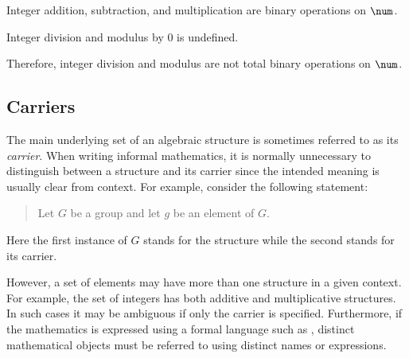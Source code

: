 \documentclass{amsart}
\begin{document}
\begin{example}

Integer addition, subtraction, and multiplication are binary operations on $\num$.


\end{example}

\begin{example}

Integer division and modulus by $0$ is undefined.


Therefore, integer division and modulus are not total binary operations on $\num$.


\end{example}

\subsection{Carriers}

The main underlying set of an algebraic structure is sometimes referred to as its \textit{carrier}.
When writing informal mathematics, 
it is normally unnecessary to distinguish between a structure and its carrier
since the intended meaning is usually clear from context.
For example, consider the following statement:
\begin{quote}
	Let $G$ be a group and let $g$ be an element of $G$.
\end{quote}
Here the first instance of $G$ stands for the structure while the second stands for its carrier.

However, a set of elements may have more than one structure in a given context.
For example, the set of integers has both additive and multiplicative structures.
In such cases it may be ambiguous if only the carrier is specified.
Furthermore, if the mathematics is expressed using a formal language such as \ZN, 
distinct mathematical objects
must be referred to using distinct names or expressions.
\end{document}
